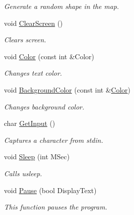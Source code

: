 \begin{DoxyCompactItemize}
\begin{DoxyCompactList}\small\item\em Generate a random shape in the map. \end{DoxyCompactList}\item 
void \hyperlink{namespace_chase_game_a3a7382465f6f23fe77cde4e589fb80d6}{Clear\-Screen} ()
\begin{DoxyCompactList}\small\item\em Clears screen. \end{DoxyCompactList}\item 
void \hyperlink{namespace_chase_game_a3a120300b1e200a26fe8680a33300283}{Color} (const int \&Color)
\begin{DoxyCompactList}\small\item\em Changes text color. \end{DoxyCompactList}\item 
void \hyperlink{namespace_chase_game_ad2dbfd93f4fd5725ab396d5dfa78a0c4}{Background\-Color} (const int \&\hyperlink{namespace_chase_game_a3a120300b1e200a26fe8680a33300283}{Color})
\begin{DoxyCompactList}\small\item\em Changes background color. \end{DoxyCompactList}\item 
char \hyperlink{namespace_chase_game_afa8eec677de5433e0e886da19f7e9c4a}{Get\-Input} ()
\begin{DoxyCompactList}\small\item\em Captures a character from stdin. \end{DoxyCompactList}\item 
void \hyperlink{namespace_chase_game_a8ca147721cdfaf96ee1f9c5007c27142}{Sleep} (int M\-Sec)
\begin{DoxyCompactList}\small\item\em Calls usleep. \end{DoxyCompactList}\item 
void \hyperlink{namespace_chase_game_a944f872ea6d98761b645f2b7d7cad8fa}{Pause} (bool Display\-Text)
\begin{DoxyCompactList}\small\item\em This function pauses the program. \end{DoxyCompactList}\end{DoxyCompactItemize}
